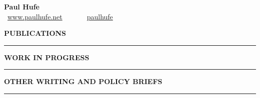 \documentclass[11pt, a4paper]{article}
\begin{document}
\begin{center}
{\LARGE \centering \textbf{Paul Hufe}}\\
{\small \faMousePointer~\href{https://www.paulhufe.net}{www.paulhufe.net}~~~~~~\faTwitter~\href{https://twitter.com/paulhufe?lang=de}{paulhufe}}
\end{center}

\vspace{.5cm}

\textbf{\uppercase{Publications}}\\
\rule[0.5ex]{\linewidth}{.5pt}\vspace{.25cm}

\hangindent=0.2cm 

\hangindent=0.2cm 

\hangindent=0.2cm 

\hangindent=0.2cm 

\hangindent=0.2cm 

\vspace{.5cm}

\textbf{\uppercase{Work in Progress}}\\
\rule[0.5ex]{\linewidth}{.5pt}\vspace{.25cm}

\hangindent=0.2cm 

\hangindent=0.2cm 

\hangindent=0.2cm 


\vspace{.5cm}
\textbf{\uppercase{Other Writing and Policy Briefs}}\\
\rule[0.5ex]{\linewidth}{.5pt}\vspace{.25cm}
\end{document}
